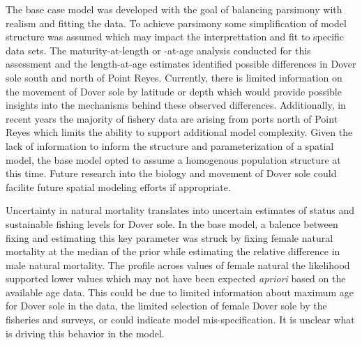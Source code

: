 \documentclass[11pt,
  english,
  a4paper,
]{article}
\begin{document}

The base case model was developed with the goal of balancing parsimony with realism and fitting the data. To achieve parsimony some simplification of model structure was assumed which may impact the interprettation and fit to specific data sets. The maturity-at-length or -at-age analysis conducted for this assessment and the length-at-age estimates identified possible differences in Dover sole south and north of Point Reyes. Currently, there is limited information on the movement of Dover sole by latitude or depth which would provide possible insights into the mechanisms behind these observed differences. Additionally, in recent years the majority of fishery data are arising from ports north of Point Reyes which limits the ability to support additional model complexity. Given the lack of information to inform the structure and parameterization of a spatial model, the base model opted to assume a homogenous population structure at this time. Future research into the biology and movement of Dover sole could facilite future spatial modeling efforts if appropriate.

\leavevmode\tagmcend\tagstructend\par


Uncertainty in natural mortality translates into uncertain estimates of status and sustainable fishing levels for Dover sole. In the base model, a balence between fixing and estimating this key parameter was struck by fixing female natural mortality at the median of the prior while estimating the relative difference in male natural mortality. The profile across values of female natural the likelihood supported lower values which may not have been expected \emph{apriori} based on the available age data. This could be due to limited information about maximum age for Dover sole in the data, the limited selection of female Dover sole by the fisheries and surveys, or could indicate model mis-specification. It is unclear what is driving this behavior in the model.

\leavevmode\tagmcend\tagstructend\par

\end{document}
